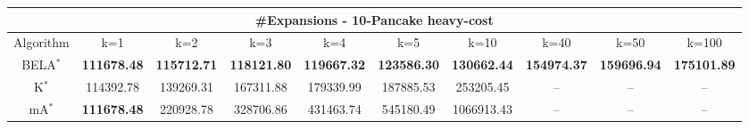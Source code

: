 \begin{tabular}{c|ccccccccc}\toprule
\multicolumn{10}{c}{#Expansions - 10-Pancake heavy-cost}\\ \midrule
Algorithm & k=1 & k=2 & k=3 & k=4 & k=5 & k=10 & k=40 & k=50 & k=100 \\ \midrule
BELA$^*$ & \textbf{111678.48} & \textbf{115712.71} & \textbf{118121.80} & \textbf{119667.32} & \textbf{123586.30} & \textbf{130662.44} & \textbf{154974.37} & \textbf{159696.94} & \textbf{175101.89} \\
K$^*$ & 114392.78 & 139269.31 & 167311.88 & 179339.99 & 187885.53 & 253205.45 & -- & -- & -- \\
mA$^*$ & \textbf{111678.48} & 220928.78 & 328706.86 & 431463.74 & 545180.49 & 1066913.43 & -- & -- & -- \\ \bottomrule 
\end{tabular}
